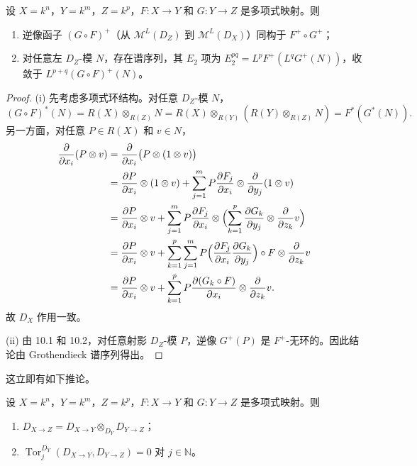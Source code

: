 \begin{theorem}
设 $X=k^n$，$Y=k^m$，$Z=k^p$，$F:X\to Y$ 和 $G:Y\to Z$ 是多项式映射。则
\begin{enumerate}[label=(\roman*)]
  \item 逆像函子 $(G\circ F)^+$（从 $\mathcal{M}^L(D_Z)$ 到 $\mathcal{M}^L(D_X)$）同构于 $F^+\circ G^+$；
  \item 对任意左 $D_Z$-模 $N$，存在谱序列，其 $E_2$ 项为 $E_2^{pq}=L^pF^+(L^qG^+(N))$，收敛于 $L^{p+q}(G\circ F)^+(N)$。
\end{enumerate}
\end{theorem}

\begin{proof}
(i) 先考虑多项式环结构。对任意 $D_Z$-模 $N$，
$$(G\circ F)^*(N)=R(X)\otimes_{R(Z)}N=R(X)\otimes_{R(Y)}(R(Y)\otimes_{R(Z)}N)=F^*(G^*(N)).$$
另一方面，对任意 $P\in R(X)$ 和 $v\in N$，
\begin{align*}
\frac{\partial}{\partial x_i}(P\otimes v)&=\frac{\partial}{\partial x_i}\bigl(P\otimes(1\otimes v)\bigr)\\
&=\frac{\partial P}{\partial x_i}\otimes(1\otimes v)+\sum_{j=1}^m P\frac{\partial F_j}{\partial x_i}\otimes\frac{\partial}{\partial y_j}(1\otimes v)\\
&=\frac{\partial P}{\partial x_i}\otimes v+\sum_{j=1}^m P\frac{\partial F_j}{\partial x_i}\otimes\Bigl(\sum_{k=1}^p\frac{\partial G_k}{\partial y_j}\otimes\frac{\partial}{\partial z_k}v\Bigr)\\
&=\frac{\partial P}{\partial x_i}\otimes v+\sum_{k=1}^p\sum_{j=1}^m P\Bigl(\frac{\partial F_j}{\partial x_i}\frac{\partial G_k}{\partial y_j}\Bigr)\circ F\otimes\frac{\partial}{\partial z_k}v\\
&=\frac{\partial P}{\partial x_i}\otimes v+\sum_{k=1}^p P\frac{\partial(G_k\circ F)}{\partial x_i}\otimes\frac{\partial}{\partial z_k}v.
\end{align*}
故 $D_X$ 作用一致。

(ii) 由 10.1 和 10.2，对任意射影 $D_Z$-模 $P$，逆像 $G^+(P)$ 是 $F^+$-无环的。因此结论由 Grothendieck 谱序列得出。
\end{proof}

这立即有如下推论。

\begin{corollary}
设 $X=k^n$，$Y=k^m$，$Z=k^p$，$F:X\to Y$ 和 $G:Y\to Z$ 是多项式映射。则
\begin{enumerate}[label=(\roman*)]
  \item $D_{X\to Z}=D_{X\to Y}\otimes_{D_Y}D_{Y\to Z}$；
  \item $\operatorname{Tor}^{D_Y}_j(D_{X\to Y},D_{Y\to Z})=0$ 对 $j\in\mathbb{N}$。
\end{enumerate}
\end{corollary}

